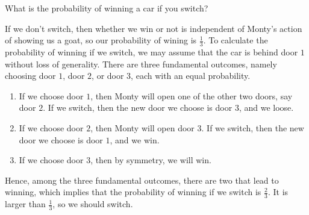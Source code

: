 \documentclass[12pt,letterpaper, onecolumn]{exam}
\begin{document}
\begin{questions}
\quad What is the probability of winning a car if you switch?
\begin{solution}
    If we don't switch, then whether we win or not is independent of Monty's action of showing us a goat, so our probability of wining is $\frac{1}{3}$. To calculate the probability of winning if we switch, we may assume that the car is behind door $1$ without loss of generality. There are three fundamental outcomes, namely choosing door $1$, door $2$, or door $3$, each with an equal probability.
    \begin{enumerate}
        \item If we choose door $1$, then Monty will open one of the other two doors, say door $2$. If we switch, then the new door we choose is door $3$, and we loose.
        \item If we choose door $2$, then Monty will open door $3$. If we switch, then the new door we choose is door $1$, and we win.
        \item If we choose door $3$, then by symmetry, we will win.
    \end{enumerate}
    Hence, among the three fundamental outcomes, there are two that lead to winning, which implies that the probability of winning if we switch is $\frac{2}{3}$. It is larger than $\frac{1}{3}$, so we should switch.
\end{solution}


\end{questions}
\end{document}
